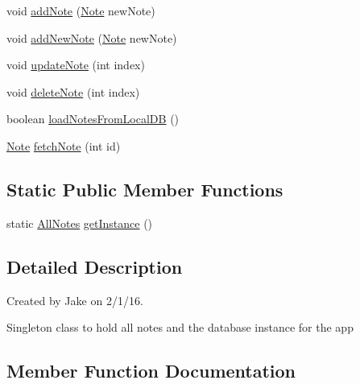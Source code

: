 \begin{DoxyCompactItemize}
\item 
void \hyperlink{classcom_1_1jakedawkins_1_1notes_1_1_all_notes_af0c95096cc82197830dbdda04341e847}{add\+Note} (\hyperlink{classcom_1_1jakedawkins_1_1notes_1_1_note}{Note} new\+Note)
\item 
void \hyperlink{classcom_1_1jakedawkins_1_1notes_1_1_all_notes_a5b306d331235e918d53ccefa4cabf215}{add\+New\+Note} (\hyperlink{classcom_1_1jakedawkins_1_1notes_1_1_note}{Note} new\+Note)
\item 
void \hyperlink{classcom_1_1jakedawkins_1_1notes_1_1_all_notes_a3eca7407e26aacd8d11caba15c281023}{update\+Note} (int index)
\item 
void \hyperlink{classcom_1_1jakedawkins_1_1notes_1_1_all_notes_adef736c6a1858c7da38f611fea43830b}{delete\+Note} (int index)
\item 
boolean \hyperlink{classcom_1_1jakedawkins_1_1notes_1_1_all_notes_ab55640c37afede82f89707c6074de156}{load\+Notes\+From\+Local\+DB} ()
\item 
\hyperlink{classcom_1_1jakedawkins_1_1notes_1_1_note}{Note} \hyperlink{classcom_1_1jakedawkins_1_1notes_1_1_all_notes_a649cb0f406724be550dd3d440914282b}{fetch\+Note} (int id)
\end{DoxyCompactItemize}
\subsection*{Static Public Member Functions}
\begin{DoxyCompactItemize}
\item 
static \hyperlink{classcom_1_1jakedawkins_1_1notes_1_1_all_notes}{All\+Notes} \hyperlink{classcom_1_1jakedawkins_1_1notes_1_1_all_notes_a98cff0be372433b577b4cb54f31f087c}{get\+Instance} ()
\end{DoxyCompactItemize}


\subsection{Detailed Description}
Created by Jake on 2/1/16.

Singleton class to hold all notes and the database instance for the app 

\subsection{Member Function Documentation}
